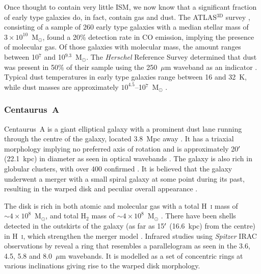 Once thought to contain very little ISM, we now know that a significant fraction of early type galaxies do, in fact, contain gas and dust.  The ATLAS$^{3\mathrm{D}}$ survey \citep{2011MNRAS.414..940Y}, consisting of a sample of 260 early type galaxies with a median stellar mass of $3 \times 10^{10}$~M$_{\odot}$, found a 20\% detection rate in CO emission, implying the presence of molecular gas.  Of those galaxies with molecular mass, the amount ranges between 10$^{7}$ and 10$^{9.3}$~M$_{\odot}$.  The \emph{Herschel} Reference Survey \citep{2010PASP..122..261B} determined that dust was present in 50\% of their sample using the 250~$\mu$m waveband as an indicator \citep{2012ApJ...748..123S}.  Typical dust temperatures in early type galaxies range between 16 and 32~K, while dust masses are approximately $10^{4.5}$--10$^{7}$~M$_{\odot}$ \citep{1998ApJ...499..670B,2012ApJ...748..123S}.

\subsubsection{Centaurus~A}\label{cena_general}
Centaurus~A is a giant elliptical galaxy with a prominent dust lane running through the centre of the galaxy, located 3.8~Mpc away \citep{2010PASA...27..457H}.  It has a triaxial morphology implying no preferred axis of rotation and is approximately 20$\mbox{$^\prime$}$ (22.1~kpc) in diameter as seen in optical wavebands \citep{1998A&ARv...8..237I}.  The galaxy is also rich in globular clusters, with over 400 confirmed \citep{2007AJ....134..494W,2010ApJ...708.1335W}.  It is believed that the galaxy underwent a merger with a small spiral galaxy at some point during its past, resulting in the warped disk and peculiar overall appearance \citep{1944ApJ...100..147B,1993ApJ...412..550Q}.

The disk is rich in both atomic and molecular gas \citep[e.g.][]{1990ApJ...363..451E,1990AJ.....99.1781V,1992ApJ...391..121Q,2010A&A...515A..67S} with a total H~\textsc{i} mass of $\sim 4 \times 10^{8}$~M$_{\odot}$, and total H$_{2}$ mass of $\sim 4 \times 10^{8}$~M$_{\odot}$ \citep{2010PASA...27..463M}.  There have been shells detected in the outskirts of the galaxy (as far as 15$\mbox{$^\prime$}$ (16.6~kpc) from the centre) in H~\textsc{i}, which strengthen the merger model \citep{1994ApJ...423L.101S}.  Infrared studies using \emph{Spitzer} IRAC observations by \citet{2006ApJ...645.1092Q} reveal a ring that resembles a parallelogram  as seen in the 3.6, 4.5, 5.8 and 8.0~$\mu$m wavebands.  It is modelled as a set of concentric rings at various inclinations giving rise to the warped disk morphology.

